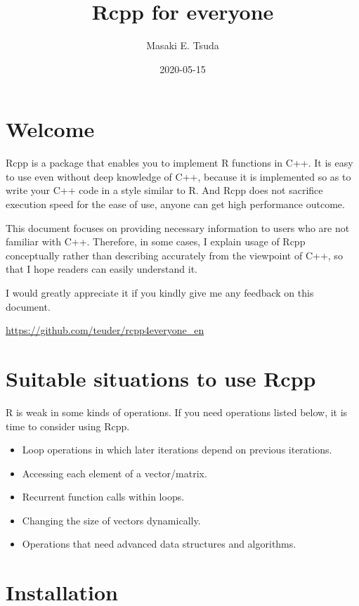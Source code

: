 \documentclass[]{book}
\title{Rcpp for everyone}
\author{Masaki E. Tsuda}
\date{2020-05-15}
\providecommand{\tightlist}{%
  \setlength{\itemsep}{0pt}\setlength{\parskip}{0pt}}
\begin{document}
\maketitle

{
\setcounter{tocdepth}{1}
\tableofcontents
}
\hypertarget{welcome}{%
\chapter*{Welcome}\label{welcome}}

Rcpp is a package that enables you to implement R functions in C++. It is easy to use even without deep knowledge of C++, because it is implemented so as to write your C++ code in a style similar to R. And Rcpp does not sacrifice execution speed for the ease of use, anyone can get high performance outcome.

This document focuses on providing necessary information to users who are not familiar with C++. Therefore, in some cases, I explain usage of Rcpp conceptually rather than describing accurately from the viewpoint of C++, so that I hope readers can easily understand it.

I would greatly appreciate it if you kindly give me any feedback on this document.

\url{https://github.com/teuder/rcpp4everyone_en}

\hypertarget{suitable-situations-to-use-rcpp}{%
\chapter{Suitable situations to use Rcpp}\label{suitable-situations-to-use-rcpp}}

R is weak in some kinds of operations. If you need operations listed below, it is time to consider using Rcpp.

\begin{itemize}
\tightlist
\item
  Loop operations in which later iterations depend on previous iterations.
\item
  Accessing each element of a vector/matrix.
\item
  Recurrent function calls within loops.
\item
  Changing the size of vectors dynamically.
\item
  Operations that need advanced data structures and algorithms.
\end{itemize}

\hypertarget{installation}{%
\chapter{Installation}\label{installation}}
\end{document}
